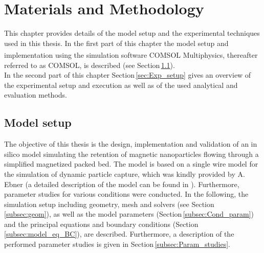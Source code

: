 % 
% 


\chapter{Materials and Methodology}
\label{chap:chap_mat}

This chapter provides details of the model setup and the experimental techniques used in this thesis. In the first part of this chapter the model setup and implementation using the simulation software COMSOL Multiphysics\textsuperscript{\textregistered}, thereafter referred to as COMSOL, is described (see Section\,\ref{sec:Model_setup}).\\
In the second part of this chapter Section\,\ref{sec:Exp_setup} gives an overview of the experimental setup and execution as well as of the used analytical and evaluation methods.  

\section{Model setup}
\label{sec:Model_setup}
The objective of this thesis is the design, implementation and validation of an in silico model simulating the retention of magnetic nanoparticles flowing through a simplified magnetized packed bed. The model is based on a single wire model for the simulation of dynamic particle capture, which was kindly provided by A. Ebner (a detailed description of the model can be found in \cite{choomphon2017simulation}). Furthermore, parameter studies for various conditions were conducted. In the following, the simulation setup including geometry, mesh and solvers (see Section\,\ref{subsec:geom}), as well as the model parameters (Section\,\ref{subsec:Cond_param}) and the principal equations and boundary conditions (Section\,\ref{subsec:model_eq_BC}), are described. Furthermore, a description of the performed parameter studies is given in Section\,\ref{subsec:Param_studies}.     

